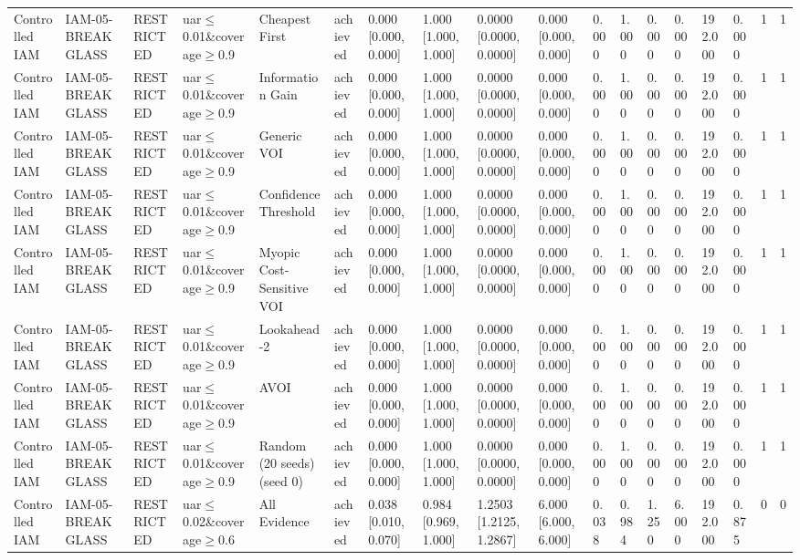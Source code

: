 \begin{table}[!ht]
{\begin{tabular}{llllllllllllllllll}
Controlled IAM & IAM-05-BREAKGLASS & RESTRICTED & uar$\le$0.01\&coverage$\ge$0.9 & Cheapest First & achieved & 0.000 [0.000, 0.000] & 1.000 [1.000, 1.000] & 0.0000 [0.0000, 0.0000] & 0.000 [0.000, 0.000] & 0.000 & 1.000 & 0.000 & 0.000 & 192.000 & 0.000 & 1 & 1 \\
Controlled IAM & IAM-05-BREAKGLASS & RESTRICTED & uar$\le$0.01\&coverage$\ge$0.9 & Information Gain & achieved & 0.000 [0.000, 0.000] & 1.000 [1.000, 1.000] & 0.0000 [0.0000, 0.0000] & 0.000 [0.000, 0.000] & 0.000 & 1.000 & 0.000 & 0.000 & 192.000 & 0.000 & 1 & 1 \\
Controlled IAM & IAM-05-BREAKGLASS & RESTRICTED & uar$\le$0.01\&coverage$\ge$0.9 & Generic VOI & achieved & 0.000 [0.000, 0.000] & 1.000 [1.000, 1.000] & 0.0000 [0.0000, 0.0000] & 0.000 [0.000, 0.000] & 0.000 & 1.000 & 0.000 & 0.000 & 192.000 & 0.000 & 1 & 1 \\
Controlled IAM & IAM-05-BREAKGLASS & RESTRICTED & uar$\le$0.01\&coverage$\ge$0.9 & Confidence Threshold & achieved & 0.000 [0.000, 0.000] & 1.000 [1.000, 1.000] & 0.0000 [0.0000, 0.0000] & 0.000 [0.000, 0.000] & 0.000 & 1.000 & 0.000 & 0.000 & 192.000 & 0.000 & 1 & 1 \\
Controlled IAM & IAM-05-BREAKGLASS & RESTRICTED & uar$\le$0.01\&coverage$\ge$0.9 & Myopic Cost-Sensitive VOI & achieved & 0.000 [0.000, 0.000] & 1.000 [1.000, 1.000] & 0.0000 [0.0000, 0.0000] & 0.000 [0.000, 0.000] & 0.000 & 1.000 & 0.000 & 0.000 & 192.000 & 0.000 & 1 & 1 \\
Controlled IAM & IAM-05-BREAKGLASS & RESTRICTED & uar$\le$0.01\&coverage$\ge$0.9 & Lookahead-2 & achieved & 0.000 [0.000, 0.000] & 1.000 [1.000, 1.000] & 0.0000 [0.0000, 0.0000] & 0.000 [0.000, 0.000] & 0.000 & 1.000 & 0.000 & 0.000 & 192.000 & 0.000 & 1 & 1 \\
Controlled IAM & IAM-05-BREAKGLASS & RESTRICTED & uar$\le$0.01\&coverage$\ge$0.9 & AVOI & achieved & 0.000 [0.000, 0.000] & 1.000 [1.000, 1.000] & 0.0000 [0.0000, 0.0000] & 0.000 [0.000, 0.000] & 0.000 & 1.000 & 0.000 & 0.000 & 192.000 & 0.000 & 1 & 1 \\
Controlled IAM & IAM-05-BREAKGLASS & RESTRICTED & uar$\le$0.01\&coverage$\ge$0.9 & Random (20 seeds) (seed 0) & achieved & 0.000 [0.000, 0.000] & 1.000 [1.000, 1.000] & 0.0000 [0.0000, 0.0000] & 0.000 [0.000, 0.000] & 0.000 & 1.000 & 0.000 & 0.000 & 192.000 & 0.000 & 1 & 1 \\
Controlled IAM & IAM-05-BREAKGLASS & RESTRICTED & uar$\le$0.02\&coverage$\ge$0.6 & All Evidence & achieved & 0.038 [0.010, 0.070] & 0.984 [0.969, 1.000] & 1.2503 [1.2125, 1.2867] & 6.000 [6.000, 6.000] & 0.038 & 0.984 & 1.250 & 6.000 & 192.000 & 0.875 & 0 & 0 \\

\end{tabular}}
\end{table}

